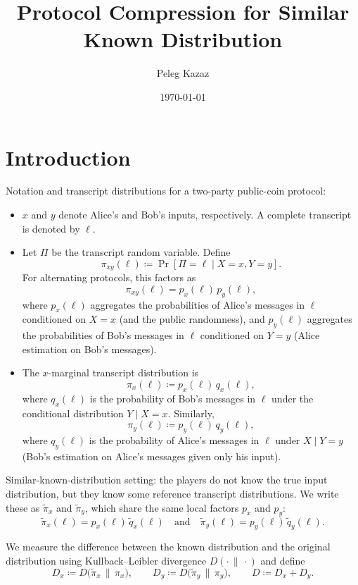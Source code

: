 \documentclass[11pt]{article}
\title{Protocol Compression for Similar Known Distribution}
\author{Peleg Kazaz}
\date{\today}
\begin{document}
\maketitle

\begin{abstract}
 
\end{abstract}

\section{Introduction}

\begin{definition}
Notation and transcript distributions for a two-party public-coin protocol:
\begin{itemize}[leftmargin=*, itemsep=2pt]
  \item $x$ and $y$ denote Alice's and Bob's inputs, respectively. A complete transcript is denoted by $\ell$.
  \item Let $\Pi$ be the transcript random variable. Define
  \[
    \pi_{xy}(\ell) \coloneqq \Pr[\Pi=\ell \mid X=x, Y=y].
  \]
  For alternating protocols, this factors as
  \[
    \pi_{xy}(\ell) = p_x(\ell)\, p_y(\ell),
  \]
  where $p_x(\ell)$ aggregates the probabilities of Alice's messages in $\ell$ conditioned on $X=x$ (and the public randomness), and $p_y(\ell)$ aggregates the probabilities of Bob's messages in $\ell$ conditioned on $Y=y$ (Alice estimation on Bob's messages).
  \item The $x$-marginal transcript distribution is
  \[
    \pi_x(\ell) \coloneqq p_x(\ell)\, q_x(\ell),
  \]
  where $q_x(\ell)$ is the probability of Bob's messages in $\ell$ under the conditional distribution $Y\mid X=x$. Similarly,
  \[
    \pi_y(\ell) \coloneqq p_y(\ell)\, q_y(\ell),
  \]
  where $q_y(\ell)$ is the probability of Alice's messages in $\ell$ under $X\mid Y=y$ (Bob's estimation on Alice's messages given only his input).
\end{itemize}

Similar-known-distribution setting: the players do not know the true input distribution, but they know some reference transcript distributions. We write these as $\tilde{\pi}_x$ and $\tilde{\pi}_y$, which share the same local factors $p_x$ and $p_y$:
\[
  \tilde{\pi}_x(\ell) = p_x(\ell)\, \tilde{q}_x(\ell)
  \quad\text{and}\quad
  \tilde{\pi}_y(\ell) = p_y(\ell)\, \tilde{q}_y(\ell).
\]

We measure the difference between the known distribution and the original distribution using Kullback--Leibler divergence $D(\cdot\,\|\,\cdot)$ and define
\[
  D_x \coloneqq D\big(\tilde{\pi}_x \,\|\, \pi_x\big),\qquad
  D_y \coloneqq D\big(\tilde{\pi}_y \,\|\, \pi_y\big),\qquad
  D \coloneqq D_x + D_y.
\]
\end{definition}
\end{document}
